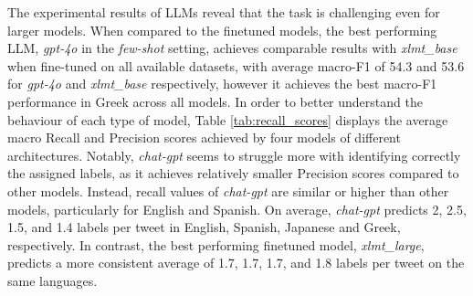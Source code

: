 \begin{table}[]
\centering
{}
\caption{Topics with the highest occurrences of False Negatives errors (topic, error \%). The results of \textit{xlmt-large} when trained on {\TweetTopic} and \textit{All}, and of \textit{gpt-4o} in the \textit{few-shot} setting are displayed.}
\label{tab:top-errors}
\end{table}



The experimental results of \acp{LLM} reveal that the task is challenging even for larger models. When compared to the finetuned models, the best performing \ac{LLM}, \textit{gpt-4o} in the \textit{few-shot} setting, achieves comparable results with \textit{xlmt\_base}  when fine-tuned  on all available datasets, with average macro-F1 of 54.3 and 53.6 for \textit{gpt-4o} and \textit{xlmt\_base} respectively, however it achieves the best macro-F1 performance in Greek across all models. In order to better understand the behaviour of each type of model, Table \ref{tab:recall_scores} displays the average macro Recall and Precision scores achieved by four models of different architectures. Notably, \textit{chat-gpt} seems to struggle more with identifying correctly the assigned labels, as it achieves relatively smaller Precision scores compared to other models. Instead, recall values of \textit{chat-gpt} are similar or higher than other models, particularly for English and Spanish. On average, \textit{chat-gpt} predicts 2, 2.5, 1.5, and 1.4 labels per tweet in English, Spanish, Japanese and Greek, respectively. In contrast, the best performing finetuned model, \textit{xlmt\_large}, predicts a more consistent average of 1.7, 1.7, 1.7, and 1.8 labels per tweet on the same languages. 

